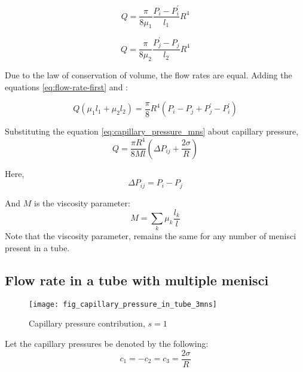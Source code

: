 	\begin{equation} \label{eq:flow-rate-first}
		Q = \frac{\pi}{8{\mu}_1} \frac{P_i - P^{'}_i}{l_1} R^4
	\end{equation}
	
	\begin{equation} \label{eq:flow-rate-second}
		Q = \frac{\pi}{8{\mu}_2} \frac{P^{'}_j - P_j}{l_2} R^4
	\end{equation}
	
	Due to the law of conservation of volume, the flow rates are equal. Adding the equations \ref{eq:flow-rate-first} and \label{eq:flow-rate-second}:
	
	\begin{equation} \label{eq:flow-rate-intermediate}
		Q({\mu}_1 l_1 + {\mu}_2 l_2) = \frac{\pi}{8}R^4(P_i - P_j + P^{'}_j - P^{'}_i)
	\end{equation}
	
	Substituting the equation \ref{eq:capillary_pressure_mns} about capillary pressure,
	\begin{equation} \label{eq:flow-rate-1mns-basic-m}
		Q = \frac{\pi R^4}{8Ml} \left( \Delta P_{ij} + \frac{2\sigma}{R} \right)
	\end{equation}
	
	Here,
	\begin{equation} \label{eq:def-pressure-difference} 
		\Delta P_{ij} = P_{i} - P_{j}
	\end{equation}
	
	And $M$ is the viscosity parameter:
	\begin{equation}
		M = \sum_{k} \mu_{k} \frac{l_{k}}{l}
	\end{equation}
	Note that the viscosity parameter, remains the same for any number of menisci present in a tube.
	
\subsection{Flow rate in a tube with multiple menisci} \label{sec:multi-menisci-flow-rate}
	\begin{figure}[H]
		\centering
		\texttt{[image: fig\_capillary\_pressure\_in\_tube\_3mns]}
		\caption{Capillary pressure contribution, $s = 1$}
		\label{fig:capillary_pressure_in_tube_3mns}
	\end{figure}
	
	Let the capillary pressures be denoted by the following:
	\begin{equation}
		c_1 = -c_2 = c_3 = \frac{2 \sigma}{R}
	\end{equation}
	
